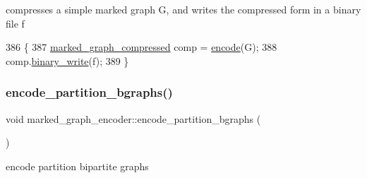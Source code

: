 compresses a simple marked graph G, and writes the compressed form in a binary file f 


\begin{DoxyCode}
386                                                                \{
387   \hyperlink{classmarked__graph__compressed}{marked\_graph\_compressed} comp = \hyperlink{classmarked__graph__encoder_aa7fa19a225dd9b31d6fef9583fab8cf1}{encode}(G);
388   comp.\hyperlink{classmarked__graph__compressed_ab9cdb7fc43badd58fb5202f74ffac723}{binary\_write}(f);
389 \}
\end{DoxyCode}
\mbox{\label{classmarked__graph__encoder_aa113c4870e3221faa332b2151b63d9e6}} 
\subsubsection{\texorpdfstring{encode\+\_\+partition\+\_\+bgraphs()}{encode\_partition\_bgraphs()}}
{\footnotesize\ttfamily void marked\+\_\+graph\+\_\+encoder\+::encode\+\_\+partition\+\_\+bgraphs (\begin{DoxyParamCaption}{ }\end{DoxyParamCaption})\hspace{0.3cm}{\ttfamily [private]}}



encode partition bipartite graphs 


